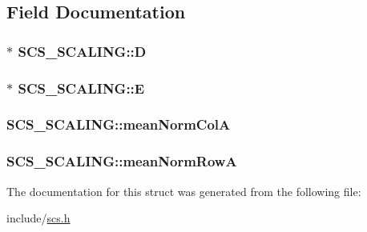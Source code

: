 \subsection{Field Documentation}
\hypertarget{struct_s_c_s___s_c_a_l_i_n_g_a91a5c44c2e48a8d6025f44ab90daedc9}{
\subsubsection[{D}]{$\ast$ S\-C\-S\-\_\-\-S\-C\-A\-L\-I\-N\-G\-::\-D}}\label{struct_s_c_s___s_c_a_l_i_n_g_a91a5c44c2e48a8d6025f44ab90daedc9}
\hypertarget{struct_s_c_s___s_c_a_l_i_n_g_ac14d067614937adf6d7ad9925129405c}{
\subsubsection[{E}]{ $\ast$ S\-C\-S\-\_\-\-S\-C\-A\-L\-I\-N\-G\-::\-E}}\label{struct_s_c_s___s_c_a_l_i_n_g_ac14d067614937adf6d7ad9925129405c}
\hypertarget{struct_s_c_s___s_c_a_l_i_n_g_ac9dbd3395f9fdafa716dc81b6b4eb68e}{
\subsubsection[{mean\-Norm\-Col\-A}]{ S\-C\-S\-\_\-\-S\-C\-A\-L\-I\-N\-G\-::mean\-Norm\-Col\-A}}\label{struct_s_c_s___s_c_a_l_i_n_g_ac9dbd3395f9fdafa716dc81b6b4eb68e}
\hypertarget{struct_s_c_s___s_c_a_l_i_n_g_a875081f04d7673908463c20387e655ad}{
\subsubsection[{mean\-Norm\-Row\-A}]{ S\-C\-S\-\_\-\-S\-C\-A\-L\-I\-N\-G\-::mean\-Norm\-Row\-A}}\label{struct_s_c_s___s_c_a_l_i_n_g_a875081f04d7673908463c20387e655ad}


The documentation for this struct was generated from the following file\-:\begin{DoxyCompactItemize}
\item 
include/\hyperlink{scs_8h}{scs.\-h}\end{DoxyCompactItemize}
